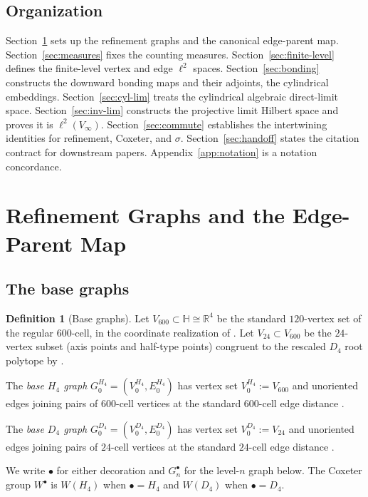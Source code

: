 \documentclass[11pt, a4paper]{amsart}
\theoremstyle{definition}
\newtheorem{definition}[theorem]{Definition}
\newcommand{\R}{\mathbb{R}}
\newcommand{\HH}{\mathbb{H}}
\begin{document}
\subsection{Organization}

Section~\ref{sec:graphs} sets up the refinement graphs and the
canonical edge-parent map. Section~\ref{sec:measures} fixes the
counting measures. Section~\ref{sec:finite-level} defines the
finite-level vertex and edge $\ell^2$ spaces.
Section~\ref{sec:bonding} constructs the downward bonding maps and
their adjoints, the cylindrical embeddings.
Section~\ref{sec:cyl-lim} treats the cylindrical algebraic
direct-limit space. Section~\ref{sec:inv-lim} constructs the
projective limit Hilbert space and proves it is $\ell^2(V_\infty)$.
Section~\ref{sec:commute} establishes the intertwining identities
for refinement, Coxeter, and $\sigma$. Section~\ref{sec:handoff}
states the citation contract for downstream papers.
Appendix~\ref{app:notation} is a notation concordance.

\section{Refinement Graphs and the Edge-Parent Map}
\label{sec:graphs}

\subsection{The base graphs}

\begin{definition}[Base graphs]
\label{def:base-graphs}
Let $V_{600} \subset \HH \cong \R^4$ be the standard $120$-vertex
set of the regular $600$-cell, in the coordinate realization of
\cite[Definition~\texttt{def:V600}]{AlgebraicSubstrate}. Let
$V_{24} \subset V_{600}$ be the $24$-vertex subset (axis points
and half-type points) congruent to the rescaled $D_4$ root
polytope by
\cite[Definition~\texttt{def:V24} and Proposition~\texttt{prop:24-in-600}]{AlgebraicSubstrate}.

The \emph{base $H_4$ graph} $G_0^{H_4} = (V_0^{H_4}, E_0^{H_4})$
has vertex set $V_0^{H_4} := V_{600}$ and unoriented edges joining
pairs of $600$-cell vertices at the standard $600$-cell edge
distance \cite[\S 22.7]{CoxeterRegularPolytopes}.

The \emph{base $D_4$ graph} $G_0^{D_4} = (V_0^{D_4}, E_0^{D_4})$
has vertex set $V_0^{D_4} := V_{24}$ and unoriented edges joining
pairs of $24$-cell vertices at the standard $24$-cell edge
distance \cite[\S 22.2]{CoxeterRegularPolytopes}.

We write $\bullet$ for either decoration and $G_n^\bullet$ for the
level-$n$ graph below. The Coxeter group $W^\bullet$ is $W(H_4)$
when $\bullet = H_4$ and $W(D_4)$ when $\bullet = D_4$.
\end{definition}
\end{document}
